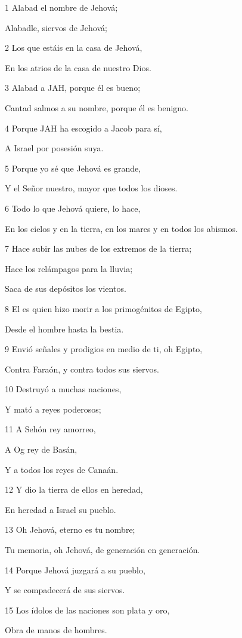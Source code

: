 \par 1 Alabad el nombre de Jehová;
\par Alabadle, siervos de Jehová;
\par 2 Los que estáis en la casa de Jehová,
\par En los atrios de la casa de nuestro Dios.
\par 3 Alabad a JAH, porque él es bueno;
\par Cantad salmos a su nombre, porque él es benigno.
\par 4 Porque JAH ha escogido a Jacob para sí,
\par A Israel por posesión suya.
\par 5 Porque yo sé que Jehová es grande,
\par Y el Señor nuestro, mayor que todos los dioses.
\par 6 Todo lo que Jehová quiere, lo hace,
\par En los cielos y en la tierra, en los mares y en todos los abismos.
\par 7 Hace subir las nubes de los extremos de la tierra;
\par Hace los relámpagos para la lluvia;
\par Saca de sus depósitos los vientos.
\par 8 El es quien hizo morir a los primogénitos de Egipto,
\par Desde el hombre hasta la bestia.
\par 9 Envió señales y prodigios en medio de ti, oh Egipto,
\par Contra Faraón, y contra todos sus siervos.
\par 10 Destruyó a muchas naciones,
\par Y mató a reyes poderosos;
\par 11 A Sehón rey amorreo,
\par A Og rey de Basán,
\par Y a todos los reyes de Canaán.
\par 12 Y dio la tierra de ellos en heredad,
\par En heredad a Israel su pueblo.
\par 13 Oh Jehová, eterno es tu nombre;
\par Tu memoria, oh Jehová, de generación en generación.
\par 14 Porque Jehová juzgará a su pueblo,
\par Y se compadecerá de sus siervos.
\par 15 Los ídolos de las naciones son plata y oro,
\par Obra de manos de hombres.
